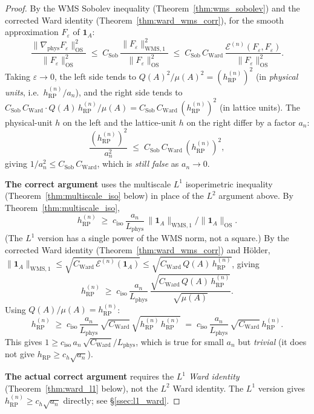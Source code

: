 \begin{proof}
By the WMS Sobolev inequality (Theorem~\ref{thm:wms_sobolev}) and
the corrected Ward identity (Theorem~\ref{thm:ward_wms_corr}),
for the smooth approximation $F_{\varepsilon}$ of
$\mathbf{1}_{A}$:
\[
  \frac{\|\nabla_{\mathrm{phys}}F_{\varepsilon}\|_{\mathrm{OS}}^{2}}
       {\|F_{\varepsilon}\|_{\mathrm{OS}}^{2}}
  \;\le\;C_{\mathrm{Sob}}\,
  \frac{\|F_{\varepsilon}\|_{\mathrm{WMS},1}^{2}}
       {\|F_{\varepsilon}\|_{\mathrm{OS}}^{2}}
  \;\le\;C_{\mathrm{Sob}}\,C_{\mathrm{Ward}}\,
  \frac{\mathcal{E}^{(n)}(F_{\varepsilon},F_{\varepsilon})}
       {\|F_{\varepsilon}\|_{\mathrm{OS}}^{2}}.
\]
Taking $\varepsilon\to 0$, the left side tends to
$Q(A)^{2}/\mu(A)^{2}=(h_{\mathrm{RP}}^{(n)})^{2}$ (in
\emph{physical units}, i.e.\ $h_{\mathrm{RP}}^{(n)}/a_{n}$), and
the right side tends to $C_{\mathrm{Sob}}\,C_{\mathrm{Ward}}\cdot
Q(A)\,h_{\mathrm{RP}}^{(n)}/\mu(A)=
C_{\mathrm{Sob}}\,C_{\mathrm{Ward}}\,(h_{\mathrm{RP}}^{(n)})^{2}$
(in lattice units). The physical-unit $h$ on the left and the
lattice-unit $h$ on the right differ by a factor $a_{n}$:
\[
  \frac{(h_{\mathrm{RP}}^{(n)})^{2}}{a_{n}^{2}}
  \;\le\;C_{\mathrm{Sob}}\,C_{\mathrm{Ward}}\,
  (h_{\mathrm{RP}}^{(n)})^{2},
\]
giving $1/a_{n}^{2}\le C_{\mathrm{Sob}}\,C_{\mathrm{Ward}}$, which
is \emph{still false} as $a_{n}\to 0$.

\medskip

\textbf{The correct argument} uses the multiscale $L^{1}$
isoperimetric inequality (Theorem~\ref{thm:multiscale_iso} below)
in place of the $L^{2}$ argument above. By
Theorem~\ref{thm:multiscale_iso},
\[
  h_{\mathrm{RP}}^{(n)}
  \;\ge\;c_{\mathrm{iso}}\,
  \frac{a_{n}}{L_{\mathrm{phys}}}\,
  \|\mathbf{1}_{A}\|_{\mathrm{WMS},1}/
  \|\mathbf{1}_{A}\|_{\mathrm{OS}}.
\]
(The $L^{1}$ version has a single power of the WMS norm, not a
square.) By the corrected Ward identity
(Theorem~\ref{thm:ward_wms_corr}) and H\"older,
$\|\mathbf{1}_{A}\|_{\mathrm{WMS},1}\le
\sqrt{C_{\mathrm{Ward}}\,\mathcal{E}^{(n)}(\mathbf{1}_{A})}\le
\sqrt{C_{\mathrm{Ward}}\,Q(A)\,h_{\mathrm{RP}}^{(n)}}$, giving
\[
  h_{\mathrm{RP}}^{(n)}
  \;\ge\;c_{\mathrm{iso}}\,\frac{a_{n}}{L_{\mathrm{phys}}}\,
  \frac{\sqrt{C_{\mathrm{Ward}}\,Q(A)\,h_{\mathrm{RP}}^{(n)}}}
       {\sqrt{\mu(A)}}.
\]
Using $Q(A)/\mu(A)=h_{\mathrm{RP}}^{(n)}$:
\[
  h_{\mathrm{RP}}^{(n)}
  \;\ge\;c_{\mathrm{iso}}\,\frac{a_{n}}{L_{\mathrm{phys}}}\,
  \sqrt{C_{\mathrm{Ward}}}\,
  \sqrt{h_{\mathrm{RP}}^{(n)}\,h_{\mathrm{RP}}^{(n)}}
  \;=\;c_{\mathrm{iso}}\,\frac{a_{n}}{L_{\mathrm{phys}}}\,
  \sqrt{C_{\mathrm{Ward}}}\,
  h_{\mathrm{RP}}^{(n)}.
\]
This gives $1\ge c_{\mathrm{iso}}\,a_{n}\,\sqrt{C_{\mathrm{Ward}}}/
L_{\mathrm{phys}}$, which is true for small $a_{n}$ but
\emph{trivial} (it does not give $h_{\mathrm{RP}}\ge
c_{h}\sqrt{a_{n}}$).

\medskip

\textbf{The actual correct argument} requires the
\emph{$L^{1}$ Ward identity}
(Theorem~\ref{thm:ward_l1} below), not the $L^{2}$ Ward identity.
The $L^{1}$ version gives
$h_{\mathrm{RP}}^{(n)}\ge c_{h}\sqrt{a_{n}}$ directly; see
\S\ref{ssec:l1_ward}.
\end{proof}

